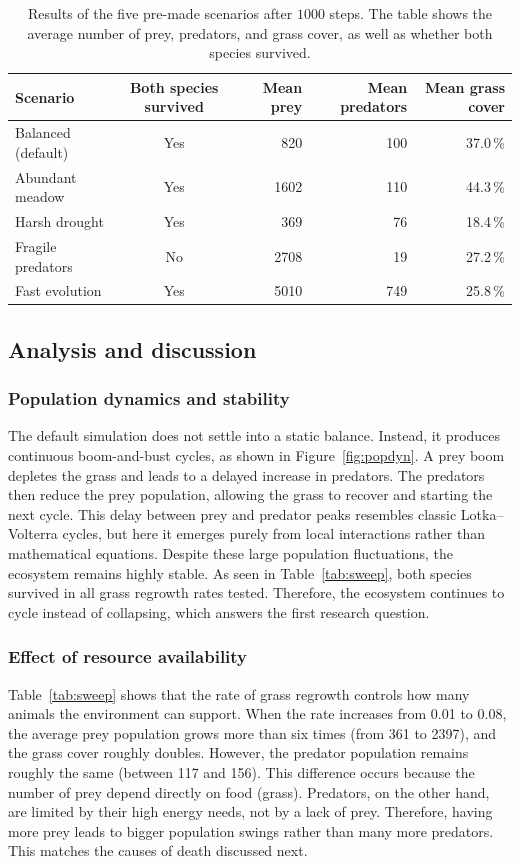 \documentclass[english]{projectreport}
\begin{document}
\begin{table}[ht]
  \centering
  \caption{Results of the five pre-made scenarios after $1000$ steps. The table shows the average number of prey, predators, and grass cover, as well as whether both species survived.}
  \label{tab:scenarios}
  \begin{tabular}{lcrrr}
    \toprule
    Scenario & Both species survived & Mean prey & Mean predators & Mean grass cover \\
    \midrule
    Balanced (default) & Yes & 820  & 100 & 37.0\,\% \\
    Abundant meadow    & Yes & 1602 & 110 & 44.3\,\% \\
    Harsh drought      & Yes & 369  & 76  & 18.4\,\% \\
    Fragile predators  & No  & 2708 & 19  & 27.2\,\% \\
    Fast evolution     & Yes & 5010 & 749 & 25.8\,\% \\
    \bottomrule
  \end{tabular}
\end{table}


\subsection{Analysis and discussion}
\label{sec:discussion}

\subsubsection{Population dynamics and stability} 
The default simulation does not settle into a static balance. Instead, it produces continuous boom-and-bust cycles, as shown in Figure~\ref{fig:popdyn}. A prey boom depletes the grass and leads to a delayed increase in predators. The predators then reduce the prey population, allowing the grass to recover and starting the next cycle. This delay between prey and predator peaks resembles classic Lotka--Volterra cycles, but here it emerges purely from local interactions rather than mathematical equations. Despite these large population fluctuations, the ecosystem remains highly stable. As seen in Table~\ref{tab:sweep}, both species survived in all grass regrowth rates tested. Therefore, the ecosystem continues to cycle instead of collapsing, which answers the first research question.

\subsubsection{Effect of resource availability} 
Table~\ref{tab:sweep} shows that the rate of grass regrowth controls how many animals the environment can support. When the rate increases from 0.01 to 0.08, the average prey population grows more than six times (from 361 to 2397), and the grass cover roughly doubles. However, the predator population remains roughly the same (between 117 and 156). This difference occurs because the number of prey depend directly on food (grass). Predators, on the other hand, are limited by their high energy needs, not by a lack of prey. Therefore, having more prey leads to bigger population swings rather than many more predators. This matches the causes of death discussed next.
\end{document}
